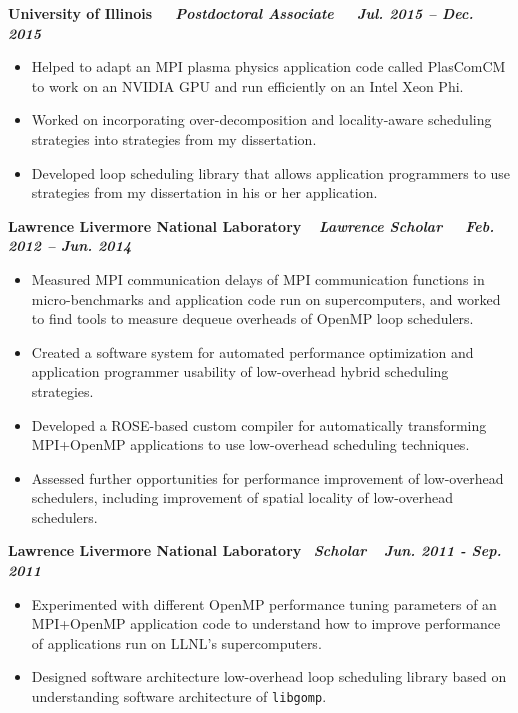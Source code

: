 {\bf University of Illinois $\>$$\>$$\>$$\>$ \textit{\textbf{Postdoctoral Associate}} $\>$$\>$$\>$$\>$ \textit{Jul. 2015 – Dec. 2015}}
\vspace*{-0.0in}
\begin{itemize} 
\item Helped to adapt an MPI plasma physics application code called PlasComCM to work on an NVIDIA GPU and run efficiently on an Intel Xeon Phi.
\item Worked on incorporating over-decomposition and locality-aware scheduling strategies into strategies from my dissertation.
\item Developed loop scheduling library that allows application programmers to use strategies from my dissertation in his or her application.
\end{itemize}

{\bf Lawrence Livermore National Laboratory$\>$$\>$$\>$$\>$ \textit{Lawrence Scholar} $\>$$\>$$\>$$\>$ \textit{Feb. 2012 – Jun. 2014}}
\vspace*{-0.0in}
\begin{itemize} 
\item Measured MPI communication delays of MPI communication functions in micro-benchmarks and application code run on supercomputers, and worked to find tools to measure dequeue overheads of OpenMP loop schedulers.
\item Created a software system for automated performance optimization and application programmer usability of low-overhead hybrid scheduling strategies.
\item Developed a ROSE-based custom compiler for automatically transforming MPI+OpenMP applications to use low-overhead scheduling techniques.
\item Assessed further opportunities for performance improvement of low-overhead schedulers, including improvement of spatial locality of low-overhead schedulers.
\end{itemize}

{\bf Lawrence Livermore National Laboratory$\>$$\>$$\>$$\>$\textit{Scholar}$\>$$\>$$\>$$\>$ \textit{Jun. 2011 - Sep. 2011}}
\vspace*{-0.0in}
\begin{itemize} 
\item Experimented with different OpenMP performance tuning parameters of an MPI+OpenMP application code to understand how to improve performance of applications run on LLNL's supercomputers.
\item Designed software architecture low-overhead loop scheduling library based on understanding software architecture of {\tt libgomp}.
\end{itemize} 

